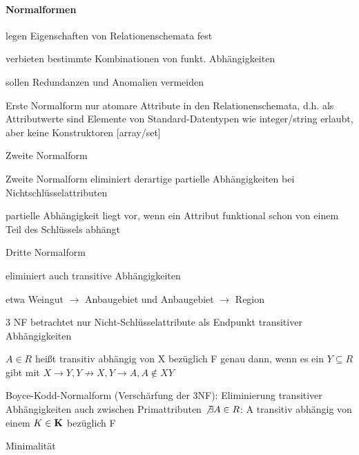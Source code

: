 \documentclass[a4paper]{article}
\begin{document}
\begin{multicols}{3}
    \paragraph{Normalformen}
    \begin{itemize*}
        \item legen Eigenschaften von Relationenschemata fest
        \item verbieten bestimmte Kombinationen von funkt. Abhängigkeiten
        \item sollen Redundanzen und Anomalien vermeiden
    \end{itemize*}
    \begin{description*}
        \item[Erste Normalform] nur atomare Attribute in den Relationenschemata, d.h. als Attributwerte sind Elemente von Standard-Datentypen wie integer/string erlaubt, aber keine Konstruktoren [array/set]
        \item[Zweite Normalform]
        \begin{itemize*}
            \item Zweite Normalform eliminiert derartige partielle Abhängigkeiten bei Nichtschlüsselattributen
            \item partielle Abhängigkeit liegt vor, wenn ein Attribut funktional schon von einem Teil des Schlüssels abhängt
        \end{itemize*}
        \item[Dritte Normalform]
        \begin{itemize*}
            \item eliminiert auch transitive Abhängigkeiten
            \item etwa Weingut $\rightarrow$ Anbaugebiet und Anbaugebiet $\rightarrow$ Region
            \item 3 NF betrachtet nur Nicht-Schlüsselattribute als Endpunkt transitiver Abhängigkeiten
            \item $A \in R$ heißt transitiv abhängig von X bezüglich F genau dann, wenn es ein $Y\subseteq R$ gibt mit $X \rightarrow Y, Y \not\rightarrow X, Y \rightarrow A, A \not\in XY$
        \end{itemize*}
        \item[Boyce-Kodd-Normalform] (Verschärfung der 3NF): Eliminierung transitiver Abhängigkeiten auch zwischen Primattributen $\not\exists A \in R$: A transitiv abhängig von einem $K\in\bf{K}$ bezüglich F
        \item[Minimalität]
        \begin{itemize*}

\end{itemize*}
\end{description*}
\end{multicols}
\end{document}
